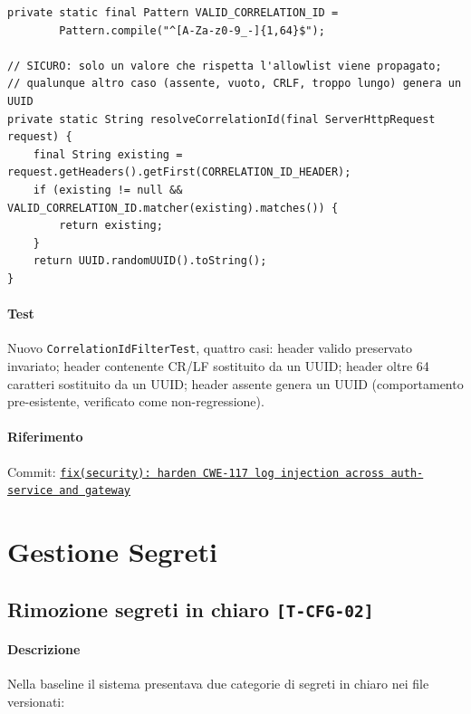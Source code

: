 ﻿\documentclass[a4paper,12pt]{report}
\newcommand{\commitref}[2]{\texttt{\small \href{https://github.com/diegoandruccioli/hotel-pms/commit/#1}{#2}}}
\newcommand{\threat}[1]{\texttt{\small\textcolor{vulnred}{[#1]}}}
\begin{document}
\begin{securebox}[title={Codice Sicuro --- CorrelationIdFilter.java (fix)}]
\begin{lstlisting}[style=java]
private static final Pattern VALID_CORRELATION_ID =
        Pattern.compile("^[A-Za-z0-9_-]{1,64}$");

// SICURO: solo un valore che rispetta l'allowlist viene propagato;
// qualunque altro caso (assente, vuoto, CRLF, troppo lungo) genera un UUID
private static String resolveCorrelationId(final ServerHttpRequest request) {
    final String existing = request.getHeaders().getFirst(CORRELATION_ID_HEADER);
    if (existing != null && VALID_CORRELATION_ID.matcher(existing).matches()) {
        return existing;
    }
    return UUID.randomUUID().toString();
}
\end{lstlisting}
\end{securebox}

\paragraph{Test}
Nuovo \texttt{CorrelationIdFilterTest}, quattro casi: header valido
preservato invariato; header contenente CR/LF sostituito da un UUID; header
oltre 64 caratteri sostituito da un UUID; header assente genera un UUID
(comportamento pre-esistente, verificato come non-regressione).

\paragraph{Riferimento} Commit: \commitref{3b62006}{fix(security): harden CWE-117 log injection across auth-service and gateway}

\section{Gestione Segreti}

\subsection{Rimozione segreti in chiaro \threat{T-CFG-02}}

\paragraph{Descrizione}
Nella baseline il sistema presentava due categorie di segreti in chiaro nei file versionati:
\end{document}
